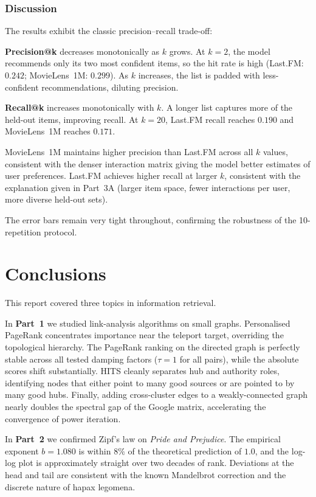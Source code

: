 \documentclass[12pt, a4paper]{article}
\begin{document}
\subsubsection*{Discussion}

The results exhibit the classic precision--recall trade-off:

\textbf{Precision@k} decreases monotonically as $k$ grows.
At $k=2$, the model recommends only its two most confident items, so
the hit rate is high (Last.FM: $0.242$; MovieLens~1M: $0.299$).
As $k$ increases, the list is padded with less-confident recommendations,
diluting precision.

\textbf{Recall@k} increases monotonically with $k$.
A longer list captures more of the held-out items, improving recall.
At $k=20$, Last.FM recall reaches $0.190$ and MovieLens~1M reaches $0.171$.

MovieLens~1M maintains higher precision than Last.FM across all $k$
values, consistent with the denser interaction matrix giving the model
better estimates of user preferences.
Last.FM achieves higher recall at larger $k$, consistent with the
explanation given in Part~3A (larger item space, fewer interactions per
user, more diverse held-out sets).

The error bars remain very tight throughout, confirming the robustness
of the 10-repetition protocol.

\section{Conclusions}

This report covered three topics in information retrieval.

In \textbf{Part~1} we studied link-analysis algorithms on small graphs.
Personalised PageRank concentrates importance near the teleport target,
overriding the topological hierarchy. The PageRank ranking on the directed
graph is perfectly stable across all tested damping factors ($\tau=1$ for
all pairs), while the absolute scores shift substantially. HITS cleanly
separates hub and authority roles, identifying nodes that either point to
many good sources or are pointed to by many good hubs. Finally, adding
cross-cluster edges to a weakly-connected graph nearly doubles the spectral
gap of the Google matrix, accelerating the convergence of power iteration.

In \textbf{Part~2} we confirmed Zipf's law on \textit{Pride and Prejudice}.
The empirical exponent $b = 1.080$ is within $8\%$ of the theoretical
prediction of $1.0$, and the log-log plot is approximately straight over
two decades of rank. Deviations at the head and tail are consistent with
the known Mandelbrot correction and the discrete nature of hapax legomena.
\end{document}

